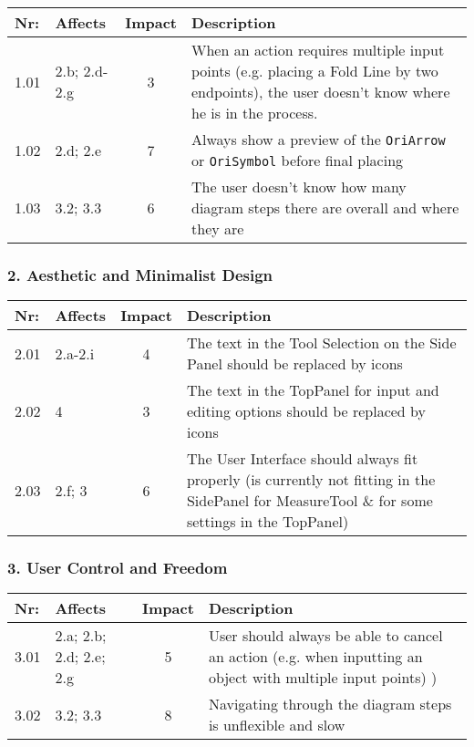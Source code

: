         \begin{tabular}{l | p{} | c | p{}}
        Nr: & Affects & Impact & Description \\ \hline
        1.01 & 2.b; 2.d-2.g & 3 & When an action requires multiple input points (e.g. placing a Fold Line by two endpoints), the user doesn't know where he is in the process. \\ \hline %
        1.02 & 2.d; 2.e & 7 & Always show a preview of the \texttt{OriArrow} or \texttt{OriSymbol} before final placing\\ \hline
        1.03 & 3.2; 3.3 & 6 & The user doesn't know how many diagram steps there are overall and where they are\\ \hline
        \end{tabular}



\subsubsection*{2. Aesthetic and Minimalist Design}
        \begin{tabular}{l | p{} | c | p{}}
        Nr: & Affects & Impact & Description \\ \hline
        2.01 & 2.a-2.i  & 4 &  The text in the Tool Selection on the Side Panel should be replaced by icons\\ \hline 
	2.02 & 4 & 3 & The text in the TopPanel for input and editing options should be replaced by icons\\ \hline
	2.03 & 2.f; 3 & 6 & The User Interface should always fit properly (is currently not fitting in the SidePanel for MeasureTool \& for some settings in the TopPanel)\\ \hline
        \end{tabular}

\subsubsection*{3. User Control and Freedom}

        \begin{tabular}{l | p{} | c | p{}}
        Nr: & Affects & Impact & Description \\ \hline
        3.01 & 2.a; 2.b; 2.d; 2.e; 2.g  & 5 & User should always be able to cancel an action (e.g. when inputting an object with multiple input points) )\\ \hline
        3.02 & 3.2; 3.3 & 8 & Navigating through the diagram steps is unflexible and slow\\ \hline 
        \end{tabular}



